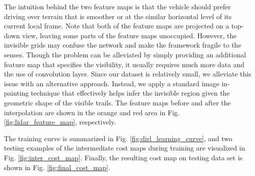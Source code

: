 \documentclass[../thesis.tex]{subfiles}
\begin{document}
The intuition behind the two feature maps is that the vehicle should prefer driving over terrain that is smoother or at the similar horizontal level of its current local frame.
Note that both of the feature maps are projected on a top-down view, leaving some parts of the feature maps unoccupied. 
However, the invisible grids may confuse the network and make the framework fragile to the senses. 
Though the problem can be alleviated by simply providing an additional feature map that specifies the visibility, it usually requires much more data and the use of convolution layer. \cite{wulfmeier2015maximum,wulfmeier2016watch}
Since our dataset is relatively small, we alleviate this issue with an alternative approach. 
Instead, we apply a standard image in-painting technique \cite{telea2004image} that effectively helps infer the invisible region given the geometric shape of the visible trails. 
The feature maps before and after the interpolation are shown in the orange and red area in Fig. \ref{fig:lidar_feature_map}, respectively.

The training curve is summarized in Fig. \ref{fig:dirl_learning_curve}, and two testing examples of the intermediate cost maps during training are visualized in Fig. \ref{fig:inter_cost_map}. Finally, the resulting cost map on testing data set is shown in Fig. \ref{fig:final_cost_map}.
\end{document}
